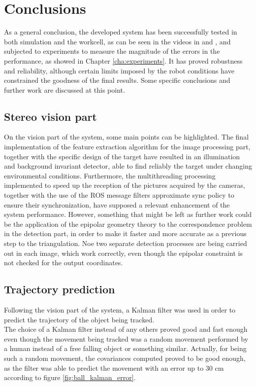 
\chapter{Conclusions} %
\label{cha:conclusions}
As a general conclusion, the developed system has been successfully tested in both simulation and the workcell, as can be seen in the videos in \cite{results1} and \cite{results2}, and subjected to experiments to measure the magnitude of the errors in the performance, as showed in Chapter \ref{cha:experiments}.
It has proved robustness and reliability, although certain limits imposed by the robot conditions have constrained the goodness of the final results. Some specific conclusions and further work are discussed at this point.

\section{Stereo vision part}
On the vision part of the system, some main points can be highlighted.
The final implementation of the feature extraction algorithm for the image processing part, together with the specific design of the target have resulted in an illumination and background invariant detector, able to find reliably the target under changing environmental conditions.
Furthermore, the multithreading processing implemented to speed up the reception of the pictures acquired by the cameras, together with the use of the ROS message filters approximate sync policy to ensure their synchronization, have supposed a relevant enhancement of the system performance.
However, something that might be left as further work could be the application of the epipolar geometry theory to the correspondence problem in the detection part, in order to make it faster and more accurate as a previous step to the triangulation. 
Noe two separate detection processes are being carried out in each image, which work correctly, even though the epipolar constraint is not checked for the output coordinates.

\section{Trajectory prediction}
Following the vision part of the system, a Kalman filter was used in order to predict the trajectory of the object being tracked.\\
The choice of a Kalman filter instead of any others proved good and fast enough even though the movement being tracked was a random movement performed by a human instead of a free falling object or something similar. Actually, for being such a random movement, the covariances computed proved to be good enough, as the filter was able to predict the movement with an error up to 30 cm according to figure \ref{fig:ball_kalman_error}.

